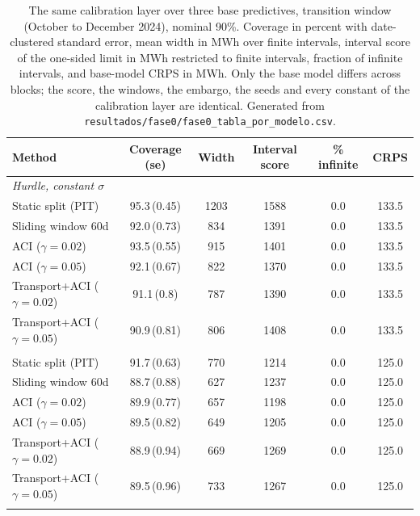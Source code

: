 \begin{table}[t]
\centering
\footnotesize
\caption{The same calibration layer over three base predictives, transition window (October to December 2024), nominal 90\%. Coverage in percent with date-clustered standard error, mean width in MWh over finite intervals, interval score of the one-sided limit in MWh restricted to finite intervals, fraction of infinite intervals, and base-model CRPS in MWh. Only the base model differs across blocks; the score, the windows, the embargo, the seeds and every constant of the calibration layer are identical. Generated from \texttt{resultados/fase0/fase0\_tabla\_por\_modelo.csv}.}
\label{tab:agnostic}
\begin{tabular}{lccccc}
\toprule
Method & Coverage (se) & Width & Interval score & \% infinite & CRPS \\
\midrule
\multicolumn{6}{l}{\emph{Hurdle, constant $\sigma$}} \\
\quad Static split (PIT) & 95.3\,(0.45) & 1203 & 1588 & 0.0 & 133.5 \\
\quad Sliding window 60d & 92.0\,(0.73) & 834 & 1391 & 0.0 & 133.5 \\
\quad ACI ($\gamma{=}0.02$) & 93.5\,(0.55) & 915 & 1401 & 0.0 & 133.5 \\
\quad ACI ($\gamma{=}0.05$) & 92.1\,(0.67) & 822 & 1370 & 0.0 & 133.5 \\
\quad Transport+ACI ($\gamma{=}0.02$) & 91.1\,(0.8) & 787 & 1390 & 0.0 & 133.5 \\
\quad Transport+ACI ($\gamma{=}0.05$) & 90.9\,(0.81) & 806 & 1408 & 0.0 & 133.5 \\
\addlinespace
\multicolumn{6}{l}{\emph{Hurdle, $\sigma(x)$}} \\
\quad Static split (PIT) & 91.7\,(0.63) & 770 & 1214 & 0.0 & 125.0 \\
\quad Sliding window 60d & 88.7\,(0.88) & 627 & 1237 & 0.0 & 125.0 \\
\quad ACI ($\gamma{=}0.02$) & 89.9\,(0.77) & 657 & 1198 & 0.0 & 125.0 \\
\quad ACI ($\gamma{=}0.05$) & 89.5\,(0.82) & 649 & 1205 & 0.0 & 125.0 \\
\quad Transport+ACI ($\gamma{=}0.02$) & 88.9\,(0.94) & 669 & 1269 & 0.0 & 125.0 \\
\quad Transport+ACI ($\gamma{=}0.05$) & 89.5\,(0.96) & 733 & 1267 & 0.0 & 125.0 \\
\addlinespace
\multicolumn{6}{l}{\emph{Quantile GBM}} \\

\end{tabular}
\end{table}
